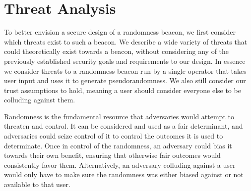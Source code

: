 \section{Threat Analysis}
To better envision a secure design of a randomness beacon, we first consider which threats exist to such a beacon. We describe a wide variety of threats that could theoretically exist towards a beacon, without considering any of the previously established security goals and requirements to our design. In essence we consider threats to a randomness beacon run by a single operator that takes user input and uses it to generate pseudorandomness. We also still consider our trust assumptions to hold, meaning a user should consider everyone else to be colluding against them.

Randomness is the fundamental resource that adversaries would attempt to threaten and control. It can be considered and used as a fair determinant, and adversaries could seize control of it to control the outcomes it is used to determinate. Once in control of the randomness, an adversary could bias it towards their own benefit, ensuring that otherwise fair outcomes would consistently favor them. Alternatively, an adversary colluding against a user would only have to make sure the randomness was either biased against or not available to that user.

